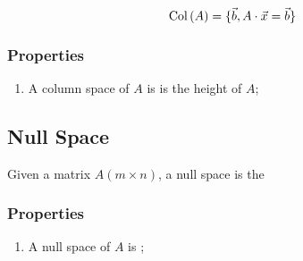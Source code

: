   \begin{displaymath}
    \operatorname{Col} \left( A \right) = \{ \vec{b}, A \cdot \vec{x} = \vec{b} \}
  \end{displaymath}
  
  \subsubsection{Properties}
  
    \begin{enumerate}
      \item A column space of $ A $ is 
      is the height of $ A $;
    \end{enumerate}
    
\subsection{Null Space}

  \begin{definition}
    Given a matrix $ A \left( m \times n \right) $, a null space 
    is the 
  \end{definition}
  
  \subsubsection{Properties}
  
    \begin{enumerate}
      \item A null space of $ A $ is 
      ;
    \end{enumerate}